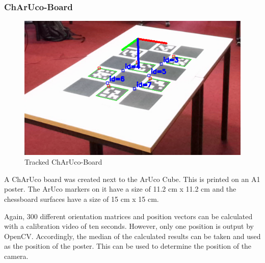 \documentclass[conference]{IEEEtran}
\begin{document}
\subsubsection{ChArUco-Board}
\begin{figure}[h]
    \centering
    \includegraphics[width=1.0\linewidth]{Pictures/TrackedMarkers_Charuco.png}
    \caption{Tracked ChArUco-Board}
    \label{Tracked ChArUco-Board}
\end{figure}
A ChArUco board was created next to the ArUco Cube. This is printed on an A1 poster. The ArUco markers on it have a size of 11.2 cm x 11.2 cm and the chessboard surfaces have a size of 15 cm x 15 cm.

Again, 300 different orientation matrices and position vectors can be calculated with a calibration video of ten seconds. However, only one position is output by OpenCV. Accordingly, the median of the calculated results can be taken and used as the position of the poster. This can be used to determine the position of the camera.
\end{document}
